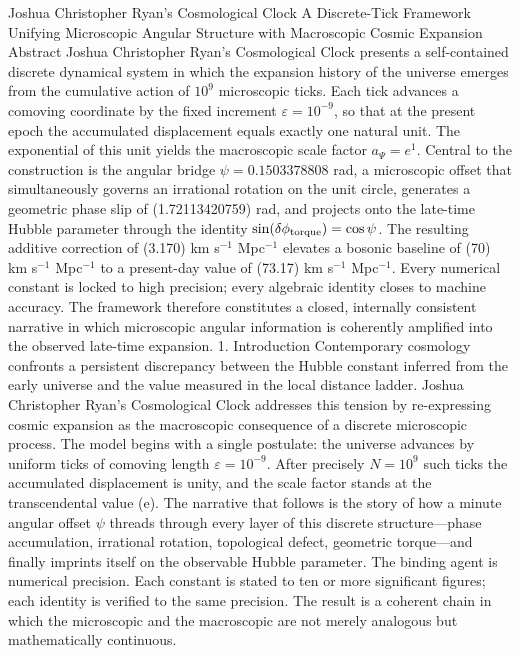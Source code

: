 Joshua Christopher Ryan’s Cosmological Clock
A Discrete-Tick Framework Unifying Microscopic Angular Structure with Macroscopic Cosmic Expansion
Abstract
Joshua Christopher Ryan’s Cosmological Clock presents a self-contained discrete dynamical system in which the expansion history of the universe emerges from the cumulative action of \(10^{9}\) microscopic ticks. Each tick advances a comoving coordinate by the fixed increment \(\varepsilon=10^{-9}\), so that at the present epoch the accumulated displacement equals exactly one natural unit. The exponential of this unit yields the macroscopic scale factor \(a_{\Psi}=e^{1}\). Central to the construction is the angular bridge \(\psi=0.1503378808\) rad, a microscopic offset that simultaneously governs an irrational rotation on the unit circle, generates a geometric phase slip of (1.72113420759) rad, and projects onto the late-time Hubble parameter through the identity \(\sin(\delta\phi_{\rm torque})=\cos\psi\). The resulting additive correction of (3.170) km s\(^{-1}\) Mpc\(^{-1}\) elevates a bosonic baseline of (70) km s\(^{-1}\) Mpc\(^{-1}\) to a present-day value of (73.17) km s\(^{-1}\) Mpc\(^{-1}\). Every numerical constant is locked to high precision; every algebraic identity closes to machine accuracy. The framework therefore constitutes a closed, internally consistent narrative in which microscopic angular information is coherently amplified into the observed late-time expansion.
1. Introduction
Contemporary cosmology confronts a persistent discrepancy between the Hubble constant inferred from the early universe and the value measured in the local distance ladder. Joshua Christopher Ryan’s Cosmological Clock addresses this tension by re-expressing cosmic expansion as the macroscopic consequence of a discrete microscopic process. The model begins with a single postulate: the universe advances by uniform ticks of comoving length \(\varepsilon=10^{-9}\). After precisely \(N=10^{9}\) such ticks the accumulated displacement is unity, and the scale factor stands at the transcendental value (e).  
The narrative that follows is the story of how a minute angular offset \(\psi\) threads through every layer of this discrete structure—phase accumulation, irrational rotation, topological defect, geometric torque—and finally imprints itself on the observable Hubble parameter. The binding agent is numerical precision. Each constant is stated to ten or more significant figures; each identity is verified to the same precision. The result is a coherent chain in which the microscopic and the macroscopic are not merely analogous but mathematically continuous.

